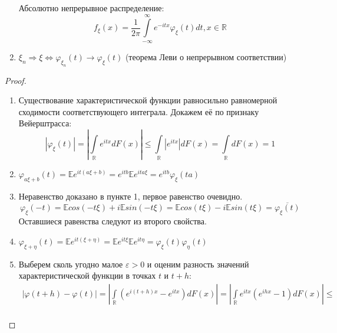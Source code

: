 \begin{namedthm}
\begin{enumerate}
        Абсолютно непрерывное распределение:
        \begin{equation*}
            f_{\xi}(x)=\frac{1}{2 \pi} \int\limits_{-\infty}^{\infty} e^{-i t x} \varphi_{\xi}(t) d t, x \in \mathbb{R}
        \end{equation*}
    \item $\xi_n \Rightarrow \xi \Leftrightarrow \varphi_{\xi_{n}}(t) \to \varphi_{\xi}(t)$ (теорема Леви о непрерывном соответствии)
    \end{enumerate}
\end{namedthm}

\begin{proof}
    \begin{enumerate}
        \item Существование характеристической функции равносильно равномерной сходимости соответствующего интеграла. Докажем её по признаку Вейерштрасса:
        \begin{equation*}
            \left|\varphi_{\xi}(t)\right|=\left|\int\limits_{\mathbb{R}} e^{i t x} d F(x)\right| \leqslant \int\limits_{\mathbb{R}}\left|e^{i t x}\right| d F(x)=\int\limits_{\mathbb{R}} d F(x)=1
        \end{equation*}
        \item $\varphi_{a \xi+b}(t) 
        = \mathbb{E}e^{i t(a \xi+b)}
        = e^{i t b} \mathbb{E}e^{i t a \xi}
        = e^{i t b} \varphi_{\xi}(t a)$
        \item Неравенство доказано в пункте 1, первое равенство очевидно.
        \begin{equation*}
            \varphi_{\xi}(-t) = \mathbb{E}cos(-t \xi) + i\mathbb{E}sin(-t \xi) = \mathbb{E}cos(t \xi) - i\mathbb{E}sin(t \xi) = \overline{\varphi_{\xi}(t)}
        \end{equation*}
        Оставшиеся равенства следуют из второго свойства.
        \item $\varphi_{\xi + \eta}(t) 
        = \mathbb{E}e^{it(\xi + \eta)} 
        = \mathbb{E}e^{it\xi}\mathbb{E}e^{it\eta}
        = \varphi_{\xi}(t)\varphi_{\eta}(t)$
        \item Выберем сколь угодно малое $\varepsilon > 0$ и оценим разность значений характеристической функции в точках $t$ и $t + h$:
        \begin{multline*}
            |\varphi(t+h)-\varphi(t)| 
            = \left|\int\limits_{\mathbb{R}} \left(e^{i(t+h) x}-e^{i tx}\right) d F(x)\right|
            = \left|\int\limits_{\mathbb{R}} e^{i t x}\left(e^{i h x}-1\right) d F(x)\right| \leqslant \\

\end{multline*}
\end{enumerate}
\end{proof}
